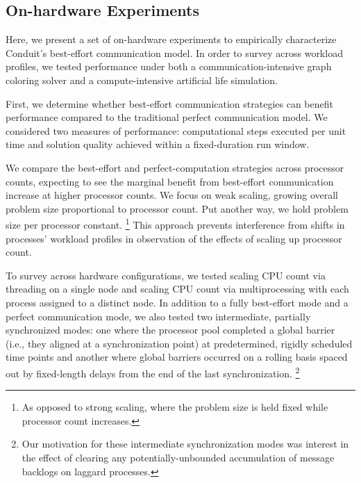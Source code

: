 \subsection{On-hardware Experiments}

Here, we present a set of on-hardware experiments to empirically characterize Conduit's best-effort communication model.
In order to survey across workload profiles, we tested performance under both a communication-intensive graph coloring solver and a compute-intensive artificial life simulation.

First, we determine whether best-effort communication strategies can benefit performance compared to the traditional perfect communication model.
We considered two measures of performance: computational steps executed per unit time and solution quality achieved within a fixed-duration run window.

We compare the best-effort and perfect-computation strategies across processor counts, expecting to see the marginal benefit from best-effort communication increase at higher processor counts.
We focus on weak scaling, growing overall problem size proportional to processor count.
Put another way, we hold problem size per processor constant.%
\footnote{
As opposed to strong scaling, where the problem size is held fixed while processor count increases.
}
This approach prevents interference from shifts in processes' workload profiles in observation of the effects of scaling up processor count.

To survey across hardware configurations, we tested scaling CPU count via threading on a single node and scaling CPU count via multiprocessing with each process assigned to a distinct node.
In addition to a fully best-effort mode and a perfect communication mode, we also tested two intermediate, partially synchronized modes: one where the processor pool completed a global barrier (i.e., they aligned at a synchronization point) at predetermined, rigidly scheduled time points and another where global barriers occurred on a rolling basis spaced out by fixed-length delays from the end of the last synchronization.%
\footnote{
Our motivation for these intermediate synchronization modes was interest in the effect of clearing any potentially-unbounded accumulation of message backlogs on laggard processes.
}

